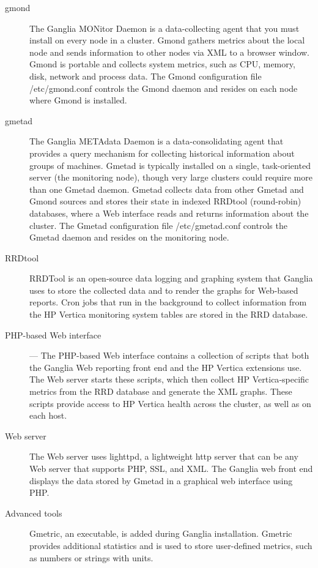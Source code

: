 \begin{description}

\item[gmond] The Ganglia MONitor Daemon is a data-collecting agent that you must
install on every node in a cluster. Gmond gathers metrics about the local node
and sends information to other nodes via XML to a browser window. Gmond is
portable and collects system metrics, such as CPU, memory, disk, network and
process data. The Gmond configuration file /etc/gmond.conf controls the Gmond
daemon and resides on each node where Gmond is installed.
    
\item[gmetad] The Ganglia METAdata Daemon is a data-consolidating agent that
provides a query mechanism for collecting historical information about groups of
machines. Gmetad is typically installed on a single, task-oriented server (the
monitoring node), though very large clusters could require more than one Gmetad
daemon. Gmetad collects data from other Gmetad and Gmond sources and stores
their state in indexed RRDtool (round-robin) databases, where a Web interface
reads and returns information about the cluster. The Gmetad configuration file
/etc/gmetad.conf controls the Gmetad daemon and resides on the monitoring node.
    
\item[RRDtool] RRDTool is an open-source data logging and graphing system that
Ganglia uses to store the collected data and to render the graphs for Web-based
reports. Cron jobs that run in the background to collect information from the HP
Vertica monitoring system tables are stored in the RRD database.
    
\item[PHP-based Web interface] — The PHP-based Web interface contains a
collection of scripts that both the Ganglia Web reporting front end and the HP
Vertica extensions use. The Web server starts these scripts, which then collect
HP Vertica‑specific metrics from the RRD database and generate the XML graphs.
These scripts provide access to HP Vertica health across the cluster, as well as
on each host.

\item[Web server] The Web server uses lighttpd, a lightweight http server that
can be any Web server that supports PHP, SSL, and XML. The Ganglia web front end
displays the data stored by Gmetad in a graphical web interface using PHP.
\item[Advanced tools] Gmetric, an executable, is added during Ganglia
installation. Gmetric provides additional statistics and is used to store
user-defined metrics, such as numbers or strings with units.

\end{description}

